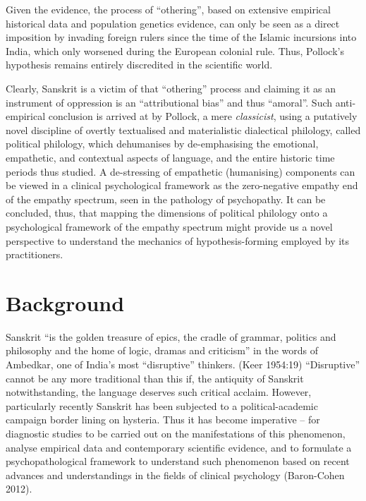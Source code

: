 Given the evidence, the process of “othering”, based on extensive empirical historical data and population genetics evidence, can only be seen as a direct imposition by invading foreign rulers since the time of the Islamic incursions into India, which only worsened during the European colonial rule. Thus, Pollock’s hypothesis remains entirely discredited in the scientific world.

Clearly, Sanskrit is a victim of that “othering” process and claiming it as an instrument of oppression is an “attributional bias” and thus “amoral”. Such anti-empirical conclusion is arrived at by Pollock, a mere \textit{classicist}, using a putatively novel discipline of overtly textualised and materialistic dialectical philology, called political philology, which dehumanises by de-emphasising the emotional, empathetic, and contextual aspects of language, and the entire historic time periods thus studied. A de-stressing of empathetic (humanising) components can be viewed in a clinical psychological framework as the zero-negative empathy end of the empathy spectrum, seen in the pathology of psychopathy. It can be concluded, thus, that mapping the dimensions of political philology onto a psychological framework of the empathy spectrum might provide us a novel perspective to understand the mechanics of hypothesis-forming employed by its practitioners.

\vspace{-.3cm}

\section*{Background}

Sanskrit “is the golden treasure of epics, the cradle of grammar, politics and philosophy and the home of logic, dramas and criticism” in the words of Ambedkar, one of India’s most “disruptive” thinkers. (Keer 1954:19) “Disruptive” cannot be any more traditional than this if, the antiquity of Sanskrit notwithstanding, the language deserves such critical acclaim. However, particularly recently Sanskrit has been subjected to a political-academic campaign border lining on hysteria. Thus it has become imperative – for diagnostic studies to be carried out on the manifestations of this phenomenon, analyse empirical data and contemporary scientific evidence, and to formulate a psychopathological framework to understand such phenomenon based on recent advances and understandings in the fields of clinical psychology (Baron-Cohen 2012).

